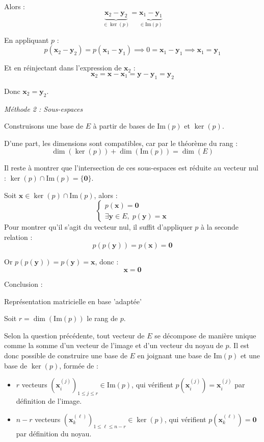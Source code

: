 \documentclass[10pt,a4paper]{article}
\begin{document}
Alors : $$\underbrace{\mathbf{x}_2 - \mathbf{y}_2}_{\in \ker(p)} = \underbrace{\mathbf{x}_1 -
\mathbf{y}_1}_{\in \mathrm{Im}(p)}$$

En appliquant $p$ :
$$p(\mathbf{x}_2 - \mathbf{y}_2) = p(\mathbf{x}_1 - \mathbf{y}_1) \implies 0 = \mathbf{x}_1 -
\mathbf{y}_1 \implies \mathbf{x}_1 = \mathbf{y}_1$$

Et en réinjectant dans l'expression de $\mathbf{x}_2$ :
$$\mathbf{x}_2 = \mathbf{x} - \mathbf{x}_1 = \mathbf{y} - \mathbf{y}_1 = \mathbf{y}_2$$

Donc $\mathbf{x}_2 = \mathbf{y}_2$.

\textit{Méthode 2 : Sous-espaces}

Construisons une base de $E$ à partir de bases de $\mathrm{Im}(p)$ et $\ker(p)$.

D'une part, les dimensions sont compatibles, car par le théorème du rang :
$$\dim(\ker(p)) + \dim(\mathrm{Im}(p)) = \dim(E)$$

Il reste à montrer que l'intersection de ces sous-espaces est réduite au vecteur nul : $\ker(p) \cap
\mathrm{Im}(p) = \{\mathbf{0}\}$.

Soit $\mathbf{x} \in \ker(p) \cap \mathrm{Im}(p)$, alors :
$$
\begin{cases}
    p(\mathbf{x}) = \mathbf{0}\\
    \exists \mathbf{y} \in E, \; p(\mathbf{y}) = \mathbf{x}
\end{cases}
$$
Pour montrer qu'il s'agit du vecteur nul, il suffit d'appliquer $p$ à la seconde relation :
$$p(p(\mathbf{y})) = p(\mathbf{x}) = \mathbf{0}$$

Or $p(p(\mathbf{y})) = p(\mathbf{y}) = \mathbf{x}$, donc :
$$\mathbf{x} = \mathbf{0}$$

Conclusion : 

\q Représentation matricielle en base 'adaptée'

Soit $r = \dim(\mathrm{Im}(p))$ le rang de $p$.

Selon la question précédente, tout vecteur de $E$ se décompose de manière unique comme la somme d'un vecteur de l'image et d'un vecteur du noyau de $p$.
Il est donc possible de construire une base de $E$ en joignant une base de $\mathrm{Im}(p)$ et une
base de $\ker(p)$, formée de :

\begin{itemize}
 \item $r$ vecteurs $(\mathbf{x}_i^{(j)})_{1\leq j\leq r} \in \mathrm{Im}(p)$, qui vérifient $p(\mathbf{x}_i^{(j)}) = \mathbf{x}_i^{(j)}$ par définition de l'image.
 \item $n-r$ vecteurs $(\mathbf{x}_k^{(\ell)})_{1\leq \ell \leq n-r} \in \ker(p)$, qui vérifient $p(\mathbf{x}_k^{(\ell)}) = \mathbf{0}$ par définition du noyau.
\end{itemize}
\end{document}
